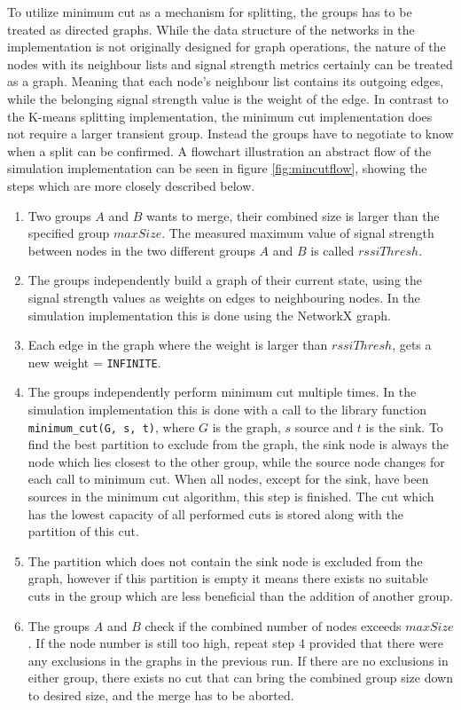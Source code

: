 To utilize minimum cut as a mechanism for splitting, the groups has to be treated as directed graphs. While the data structure of the networks in the implementation is not
originally designed for graph operations, the nature of the nodes with its neighbour lists and signal strength metrics certainly can be treated as a graph. Meaning that each node's neighbour list contains
its outgoing edges, while the belonging signal strength value is the weight of the edge. In contrast to the K-means splitting implementation, the minimum cut implementation does not require
a larger transient group. Instead the groups have to negotiate to know when a split can be confirmed. A flowchart illustration an abstract flow of the simulation implementation can be seen in figure \ref{fig:mincutflow}, showing the steps which are more closely described below. 

\begin{enumerate}
	\item Two groups $A$ and $B$ wants to merge, their combined size is larger than the specified group $maxSize$. The measured maximum value of signal strength between nodes in the two different
		groups $A$ and $B$ is called $rssiThresh$. 
	\item The groups independently build a graph of their current state, using the signal strength values as weights on edges to neighbouring nodes. In the simulation implementation this is done using the NetworkX graph.
	\item Each edge in the graph where the weight is larger than  $rssiThresh$, gets a new weight = \verb|INFINITE|.
	\item The groups independently perform minimum cut multiple times. In the simulation implementation this is done with a call to the library function \verb|minimum_cut(G, s, t)|,
		where $G$ is the graph, $s$ source and $t$ is the sink. To find the best partition to exclude from the graph, the  sink node is always the node which lies closest to the other group,
		while the source node changes for each call to minimum cut. When all nodes, except for the sink, have been sources in the minimum cut algorithm, this step is finished. The cut
		which has the lowest capacity of all performed cuts is stored along with the partition of this cut. 
	\item The partition which does not contain the sink node is excluded from the graph, however if this partition is empty it means there exists no suitable cuts in the group which are less beneficial than the addition of another group. 
	\item The groups $A$ and $B$ check if the combined number of nodes exceeds $maxSize$. If the node number is still too high, repeat step 4 provided that there were any 
		exclusions in the graphs in the previous run. If there are no exclusions in either group, there exists no cut that can bring the combined group size down to desired size, and the
		merge has to be aborted. 
\end{enumerate}

